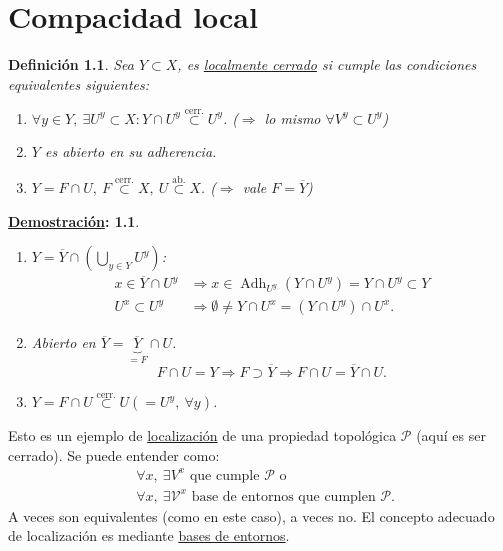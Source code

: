 \documentclass[10pt,a4paper,openright]{book}
\theoremstyle{break}
\newtheorem*{defi}{Definición}
\newtheorem*{demo}{\underline{Demostración}:}
\DeclareMathOperator{\adh}{Adh}
\begin{document}
\chapter{Compacidad local}%
\label{cha:compacidad_local}
\begin{defi}
Sea $Y \subset X$, es \underline{localmente cerrado} si cumple las condiciones equivalentes siguientes:
\begin{enumerate}
    \item $\forall y \in Y,\ \exists U^y \subset X: Y \cap U^y \stackrel{\text{cerr.}}{\subset} U^y$. ($\Rightarrow$ lo mismo $\forall V^y \subset U^y$)
    \item $Y$ es abierto en su adherencia.
    \item $Y = F \cap U,\ F \stackrel{\text{cerr.}}{\subset} X,\ U \stackrel{\text{ab.}}{\subset} X$. ($\Rightarrow$ vale $F = \overline{Y}$)
\end{enumerate}
\end{defi}
\begin{demo}
\begin{enumerate}
    \item[1. $\Rightarrow$ 2.)] $Y = \overline{Y} \cap \left( \bigcup_{y \in Y} U^y \right)$:
    \begin{align*}
        x \in \overline{Y} \cap U^y &\Rightarrow x \in \adh_{U^y} \left( Y \cap U^y \right) = Y \cap U^y \subset Y\\
        U^x \subset U^y &\Rightarrow \emptyset \neq Y \cap U^x = \left( Y \cap U^y \right) \cap U^x
    .\end{align*}
    \item[2. $\Rightarrow$ 3.)] Abierto en $\overline{Y} = \underbrace{\overline{Y}}_{= F} \cap U$.
    \[
    F \cap U = Y \Rightarrow F \supset \overline{Y} \Rightarrow F \cap U = \overline{Y} \cap U.
    \]
    \item[3. $\Rightarrow$ 1.)] $Y = F \cap U \stackrel{\text{cerr.}}{\subset} U \left( = U^y,\ \forall y \right)$.
\end{enumerate}
\end{demo}

Esto es un ejemplo de \underline{localización} de una propiedad topológica $\mathcal{P}$ (aquí es ser cerrado). Se puede entender como:
\begin{align*}
    &\forall x,\ \exists V^x \text{ que cumple } \mathcal{P} \text{ o } \\
    &\forall x,\ \exists \mathcal{V}^x \text{ base de entornos que cumplen } \mathcal{P} 
.\end{align*}
A veces son equivalentes (como en este caso), a veces no. El concepto adecuado de localización es mediante \underline{bases de entornos}.
\end{document}
